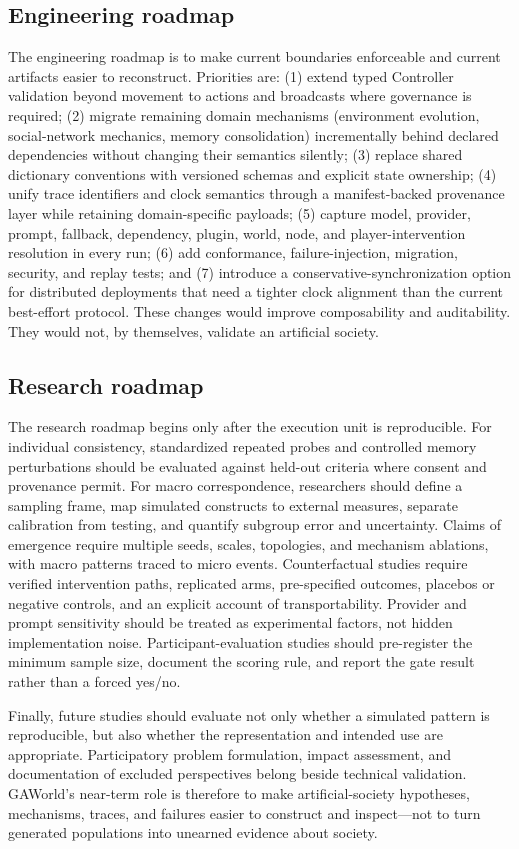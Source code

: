 \subsection{Engineering roadmap}

The engineering roadmap is to make current boundaries enforceable and
current artifacts easier to reconstruct.  Priorities are: (1) extend
typed Controller validation beyond movement to actions and broadcasts
where governance is required; (2) migrate remaining domain mechanisms
(environment evolution, social-network mechanics, memory consolidation)
incrementally behind declared dependencies without changing their
semantics silently; (3) replace shared dictionary conventions with
versioned schemas and explicit state ownership; (4) unify trace
identifiers and clock semantics through a manifest-backed provenance
layer while retaining domain-specific payloads; (5) capture model,
provider, prompt, fallback, dependency, plugin, world, node, and
player-intervention resolution in every run; (6) add conformance,
failure-injection, migration, security, and replay tests; and (7)
introduce a conservative-synchronization option for distributed
deployments that need a tighter clock alignment than the current
best-effort protocol.  These changes would improve composability and
auditability.  They would not, by themselves, validate an artificial
society.

\subsection{Research roadmap}

The research roadmap begins only after the execution unit is
reproducible.  For individual consistency, standardized repeated probes
and controlled memory perturbations should be evaluated against
held-out criteria where consent and provenance permit.  For macro
correspondence, researchers should define a sampling frame, map
simulated constructs to external measures, separate calibration from
testing, and quantify subgroup error and uncertainty.  Claims of
emergence require multiple seeds, scales, topologies, and mechanism
ablations, with macro patterns traced to micro events.  Counterfactual
studies require verified intervention paths, replicated arms,
pre-specified outcomes, placebos or negative controls, and an
explicit account of transportability.  Provider and prompt sensitivity
should be treated as experimental factors, not hidden implementation
noise.  Participant-evaluation studies should pre-register the
minimum sample size, document the scoring rule, and report the gate
result rather than a forced yes/no.

Finally, future studies should evaluate not only whether a simulated
pattern is reproducible, but also whether the representation and
intended use are appropriate.  Participatory problem formulation,
impact assessment, and documentation of excluded perspectives belong
beside technical validation.  GAWorld's near-term role is therefore to
make artificial-society hypotheses, mechanisms, traces, and failures
easier to construct and inspect---not to turn generated populations
into unearned evidence about society.
